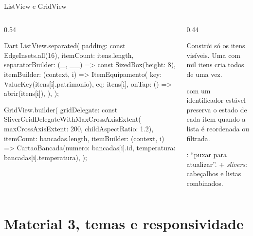 \documentclass[aspectratio=169,10pt]{beamer}
\begin{document}
\begin{frame}[fragile]{ListView e GridView}
  \begin{columns}[T]
    \begin{column}{0.54\textwidth}
\begin{codigo}[title=lista\_equipamentos.dart]{Dart}
ListView.separated(
  padding: const EdgeInsets.all(16),
  itemCount: itens.length,
  separatorBuilder: (_, __) => const SizedBox(height: 8),
  itemBuilder: (context, i) => ItemEquipamento(
    key: ValueKey(itens[i].patrimonio),
    eq: itens[i],
    onTap: () => abrir(itens[i]),
  ),
);

GridView.builder(
  gridDelegate:
      const SliverGridDelegateWithMaxCrossAxisExtent(
          maxCrossAxisExtent: 200, childAspectRatio: 1.2),
  itemCount: bancadas.length,
  itemBuilder: (context, i) =>
      CartaoBancada(numero: bancadas[i].id,
          temperatura: bancadas[i].temperatura),
);
\end{codigo}
    \end{column}
    \begin{column}{0.44\textwidth}
      \begin{conceito}[\cod{.builder} = sob demanda]
        Constrói só os itens visíveis. Uma  com mil itens cria todos de uma vez.
      \end{conceito}
      \begin{dica}[Keys]
         com um identificador estável preserva o estado de cada item quando a lista é reordenada ou filtrada.
      \end{dica}
      \begin{dica}
        : ``puxar para atualizar''.  + \emph{slivers}: cabeçalhos e listas combinados.
      \end{dica}
    \end{column}
  \end{columns}
\end{frame}

\section{Material 3, temas e responsividade}
\end{document}
